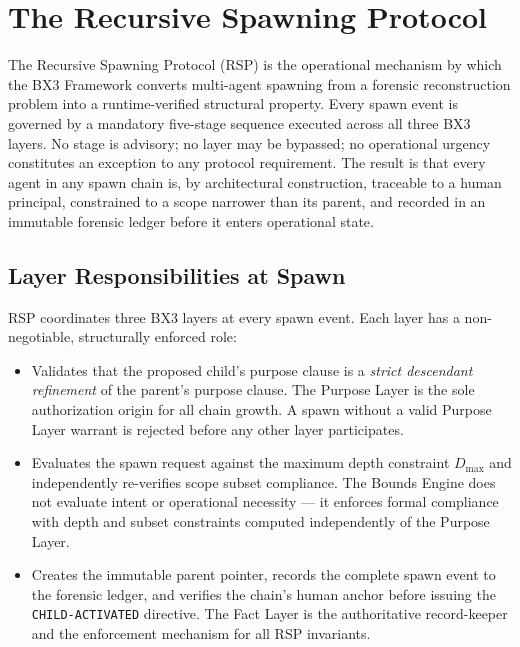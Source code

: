 \section{The Recursive Spawning Protocol}
\label{sec:rs-protocol}

The Recursive Spawning Protocol (RSP) is the operational mechanism by which the BX3 Framework converts multi-agent spawning from a forensic reconstruction problem into a runtime-verified structural property. Every spawn event is governed by a mandatory five-stage sequence executed across all three BX3 layers. No stage is advisory; no layer may be bypassed; no operational urgency constitutes an exception to any protocol requirement. The result is that every agent in any spawn chain is, by architectural construction, traceable to a human principal, constrained to a scope narrower than its parent, and recorded in an immutable forensic ledger before it enters operational state.

\subsection{Layer Responsibilities at Spawn}

RSP coordinates three BX3 layers at every spawn event. Each layer has a non-negotiable, structurally enforced role:

\begin{itemize}
  \item[\textbf{Purpose Layer.}] Validates that the proposed child's purpose clause is a \emph{strict descendant refinement} of the parent's purpose clause. The Purpose Layer is the sole authorization origin for all chain growth. A spawn without a valid Purpose Layer warrant is rejected before any other layer participates.

  \item[\textbf{Bounds Engine.}] Evaluates the spawn request against the maximum depth constraint $D_{\max}$ and independently re-verifies scope subset compliance. The Bounds Engine does not evaluate intent or operational necessity — it enforces formal compliance with depth and subset constraints computed independently of the Purpose Layer.

  \item[\textbf{Fact Layer.}] Creates the immutable parent pointer, records the complete spawn event to the forensic ledger, and verifies the chain's human anchor before issuing the \texttt{CHILD-ACTIVATED} directive. The Fact Layer is the authoritative record-keeper and the enforcement mechanism for all RSP invariants.
\end{itemize}


